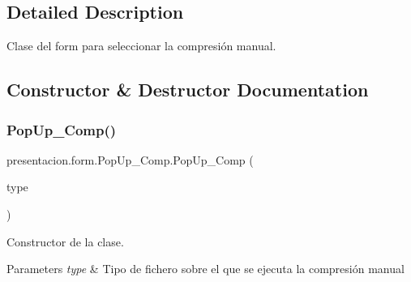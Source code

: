 \subsection{Detailed Description}
Clase del form para seleccionar la compresión manual. 

\subsection{Constructor \& Destructor Documentation}
\mbox{\label{classpresentacion_1_1form_1_1PopUp__Comp_afe8952b1a34b6ed17ad1698000ceba81}} 
\subsubsection{\texorpdfstring{Pop\+Up\+\_\+\+Comp()}{PopUp\_Comp()}}
{\footnotesize\ttfamily presentacion.\+form.\+Pop\+Up\+\_\+\+Comp.\+Pop\+Up\+\_\+\+Comp (\begin{DoxyParamCaption}\item[{global.\+type}]{type }\end{DoxyParamCaption})\hspace{0.3cm}{\ttfamily [inline]}}



Constructor de la clase. 


\begin{DoxyParams}{Parameters}
{\em type} & Tipo de fichero sobre el que se ejecuta la compresión manual \\
\hline
\end{DoxyParams}

